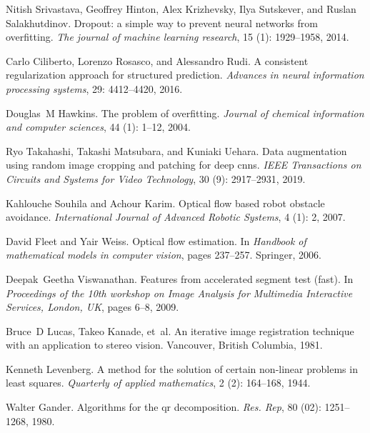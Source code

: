 \documentclass[twocolumn, switch]{article} %
\begin{document}
\begin{thebibliography}{27}
Nitish Srivastava, Geoffrey Hinton, Alex Krizhevsky, Ilya Sutskever, and Ruslan
  Salakhutdinov.
\newblock Dropout: a simple way to prevent neural networks from overfitting.
\newblock \emph{The journal of machine learning research}, 15
  (1): 1929--1958, 2014.

Carlo Ciliberto, Lorenzo Rosasco, and Alessandro Rudi.
\newblock A consistent regularization approach for structured prediction.
\newblock \emph{Advances in neural information processing systems},
  29: 4412--4420, 2016.

Douglas~M Hawkins.
\newblock The problem of overfitting.
\newblock \emph{Journal of chemical information and computer sciences},
  44 (1): 1--12, 2004.

Ryo Takahashi, Takashi Matsubara, and Kuniaki Uehara.
\newblock Data augmentation using random image cropping and patching for deep
  cnns.
\newblock \emph{IEEE Transactions on Circuits and Systems for Video
  Technology}, 30 (9): 2917--2931, 2019.

Kahlouche Souhila and Achour Karim.
\newblock Optical flow based robot obstacle avoidance.
\newblock \emph{International Journal of Advanced Robotic Systems}, 4
  (1): 2, 2007.

David Fleet and Yair Weiss.
\newblock Optical flow estimation.
\newblock In \emph{Handbook of mathematical models in computer vision}, pages
  237--257. Springer, 2006.

Deepak~Geetha Viswanathan.
\newblock Features from accelerated segment test (fast).
\newblock In \emph{Proceedings of the 10th workshop on Image Analysis for
  Multimedia Interactive Services, London, UK}, pages 6--8, 2009.

Bruce~D Lucas, Takeo Kanade, et~al.
\newblock An iterative image registration technique with an application to
  stereo vision.
\newblock Vancouver, British Columbia, 1981.

Kenneth Levenberg.
\newblock A method for the solution of certain non-linear problems in least
  squares.
\newblock \emph{Quarterly of applied mathematics}, 2 (2):
  164--168, 1944.

Walter Gander.
\newblock Algorithms for the qr decomposition.
\newblock \emph{Res. Rep}, 80 (02): 1251--1268, 1980.

\end{thebibliography}


\end{document}
